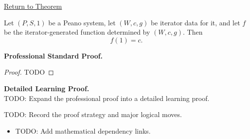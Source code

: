 \newpage
{}
\label{prf:iterator-base-value}

\begin{remark*}[Return]
\hyperref[thm:iterator-base-value]{Return to Theorem}
\end{remark*}

\begin{theorem*}
Let $(P,S,1)$ be a Peano system, let $(W,c,g)$ be iterator data for it, and let
$f$ be the iterator-generated function determined by $(W,c,g)$. Then
\[
f(1)=c.
\]
\end{theorem*}

\textbf{Professional Standard Proof.}~\\
\begin{proof}
TODO
\end{proof}

\textbf{Detailed Learning Proof.}~\\
TODO: Expand the professional proof into a detailed learning proof.

\begin{remark*}
TODO: Record the proof strategy and major logical moves.
\end{remark*}

\begin{dependencies}
\begin{itemize}
  \item TODO: Add mathematical dependency links.
\end{itemize}
\end{dependencies}
